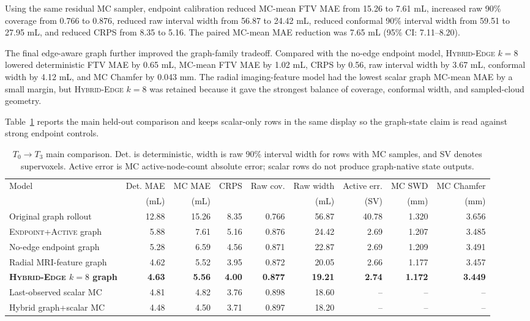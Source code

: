 \documentclass[journal,twoside,print]{ieeecolor}
\newcommand{\Tzero}{\ensuremath{T_0}}
\newcommand{\Tthree}{\ensuremath{T_3}}
\newcommand{\calibrationtag}{\textsc{Endpoint+Active}}
\newcommand{\modeltag}{\textsc{Hybrid-Edge} $k=8$}
\begin{document}
Using the same residual MC sampler, endpoint calibration reduced MC-mean FTV
MAE from 15.26 to 7.61 mL, increased raw 90\% coverage from 0.766 to 0.876,
reduced raw interval width from 56.87 to 24.42 mL, reduced conformal 90\%
interval width from 59.51 to 27.95 mL, and reduced CRPS from 8.35 to 5.16.
The paired MC-mean MAE reduction was 7.65 mL (95\% CI: 7.11--8.20).

The final edge-aware graph further improved the graph-family tradeoff. Compared
with the no-edge endpoint model, \modeltag{} lowered deterministic FTV MAE by
0.65 mL, MC-mean FTV MAE by 1.02 mL, CRPS by 0.56, raw interval width by
3.67 mL, conformal width by 4.12 mL, and MC Chamfer by 0.043 mm. The radial
imaging-feature model had the lowest scalar graph MC-mean MAE by a small
margin, but \modeltag{} was retained because it gave the strongest balance of
coverage, conformal width, and sampled-cloud geometry.

Table~\ref{tab:maincomparison} reports the main held-out comparison and keeps
scalar-only rows in the same display so the graph-state claim is read against
strong endpoint controls.

\begin{table}[t]
\centering
\caption{\Tzero$\rightarrow$\Tthree{} main comparison. Det. is deterministic,
width is raw 90\% interval width for rows with MC samples, and SV denotes
supervoxels. Active error is MC active-node-count absolute error; scalar rows
do not produce graph-native state outputs.}
\label{tab:maincomparison}
\scriptsize
\setlength{\tabcolsep}{3.0pt}
\begin{tabular}{lrrrrrrrr}
\toprule
Model & Det. MAE & MC MAE & CRPS & Raw cov. & Raw width & Active err. & MC SWD & MC Chamfer \\
 & (mL) & (mL) & & & (mL) & (SV) & (mm) & (mm) \\
\midrule
Original graph rollout & 12.88 & 15.26 & 8.35 & 0.766 & 56.87 & 40.78 & 1.320 & 3.656 \\
\calibrationtag{} graph & 5.88 & 7.61 & 5.16 & 0.876 & 24.42 & 2.69 & 1.207 & 3.485 \\
No-edge endpoint graph & 5.28 & 6.59 & 4.56 & 0.871 & 22.87 & 2.69 & 1.209 & 3.491 \\
Radial MRI-feature graph & 4.62 & 5.52 & 3.95 & 0.872 & 20.05 & 2.66 & 1.177 & 3.457 \\
\textbf{\modeltag{} graph} & \textbf{4.63} & \textbf{5.56} & \textbf{4.00} & \textbf{0.877} & \textbf{19.21} & \textbf{2.74} & \textbf{1.172} & \textbf{3.449} \\
Last-observed scalar MC & 4.81 & 4.82 & 3.76 & 0.898 & 18.60 & -- & -- & -- \\
Hybrid graph+scalar MC & 4.48 & 4.50 & 3.71 & 0.897 & 18.20 & -- & -- & -- \\
\bottomrule
\end{tabular}
\end{table}
\end{document}
